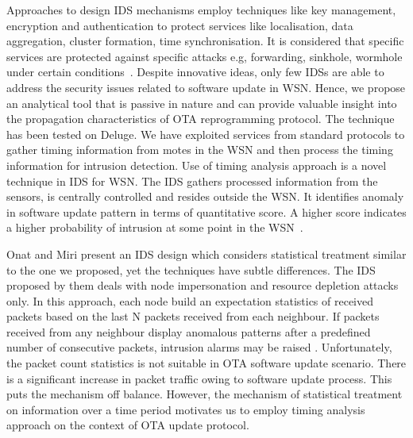 \documentclass[conference,manuscript]{IEEEtran}
\begin{document}
Approaches to design IDS mechanisms %
employ techniques like key management, encryption and authentication to protect services like localisation, data aggregation, cluster formation, time synchronisation.
It is considered that specific services are protected against specific attacks e.g, forwarding, sinkhole, wormhole under certain conditions~\cite{1639675, 6096939, sink08, 5172466}.
Despite innovative ideas, only few IDSs are able to address the security issues related to software update in WSN.
Hence, we propose an analytical tool that is passive in nature and can provide valuable insight into the propagation characteristics of OTA reprogramming protocol. 
The technique has been tested on Deluge.
We have exploited services from standard protocols to gather timing information from motes in  the WSN and then process the timing information for intrusion detection.
Use of timing analysis approach is a novel technique in IDS for WSN.
The IDS  gathers processed information from the sensors, is centrally controlled and resides outside the WSN.
It  identifies anomaly in software update pattern in terms of quantitative score. 
A higher score indicates a higher probability of intrusion at some point in the WSN~\cite{aalam14}. 

Onat and Miri present an IDS design which considers statistical treatment similar to the one we proposed, yet the techniques have subtle differences.
The IDS proposed by them deals with node impersonation and resource depletion attacks only.
In this approach, each node build an expectation statistics of received packets based on the last N packets received from each neighbour.
If packets received from any neighbour display anomalous patterns after a predefined number of consecutive packets, intrusion alarms may be raised \cite{1512911}.
Unfortunately, the  packet count statistics is not suitable in OTA software update scenario.
There is a significant increase in packet traffic owing to software update process. 
This puts the mechanism off balance.
However, the mechanism of statistical treatment on information over a time period motivates us to employ timing analysis approach on the context of OTA update protocol.
\end{document}
